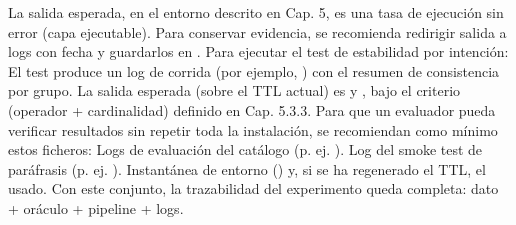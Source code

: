 {}La salida esperada, en el entorno descrito en Cap. 5, es una tasa de ejecución sin error  (capa ejecutable). Para conservar evidencia, se recomienda redirigir salida a logs con fecha y guardarlos en .\markdownRendererInterblockSeparator
{}\markdownRendererInterblockSeparator
{}Para ejecutar el test de estabilidad por intención:\markdownRendererInterblockSeparator
{}\markdownRendererInterblockSeparator
{}El test produce un log de corrida (por ejemplo, ) con el resumen de consistencia por grupo. La salida esperada (sobre el TTL actual) es  y , bajo el criterio (operador + cardinalidad) definido en Cap. 5.3.3.\markdownRendererInterblockSeparator
{}\markdownRendererInterblockSeparator
{}Para que un evaluador pueda verificar resultados sin repetir toda la instalación, se recomiendan como mínimo estos ficheros:\markdownRendererInterblockSeparator
{}\markdownRendererUlBeginTight
\markdownRendererUlItem Logs de evaluación del catálogo (p. ej. ).\markdownRendererUlItemEnd 
\markdownRendererUlItem Log del smoke test de paráfrasis (p. ej. ).\markdownRendererUlItemEnd 
\markdownRendererUlItem Instantánea de entorno () y, si se ha regenerado el TTL, el  usado.\markdownRendererUlItemEnd 
\markdownRendererUlEndTight \markdownRendererInterblockSeparator
{}Con este conjunto, la trazabilidad del experimento queda completa: dato + oráculo + pipeline + logs.\relax